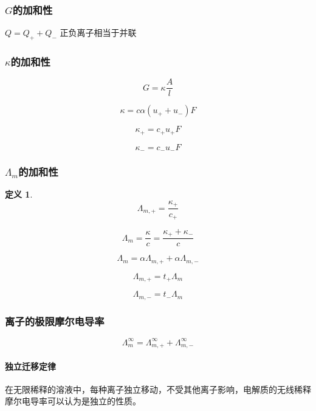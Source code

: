 \documentclass[a4paper]{ctexrep}
\newtheorem{definition}{定义}[chapter]
\begin{document}
        \subsubsection{$G$的加和性}

        $Q = Q_+ + Q_-$ 正负离子相当于并联

        \subsubsection{$\kappa$的加和性}

        \[
            G = \kappa \frac{A}{l}  
        \]

        \[
            \kappa = c\alpha(u_+ + u_-)F  
        \]

        \[
            \kappa_+ = c_+ u_+ F  
        \]

        \[
            \kappa_- = c_- u_- F  
        \]

        \subsubsection{$\varLambda_m$的加和性}

        \begin{definition}
            \[
                \varLambda_{m, +} = \frac{\kappa_+}{c_+}  
            \]
        \end{definition}

        \[
            \varLambda_m = \frac{\kappa}{c} = \frac{\kappa_+ + \kappa_-}{c}  
        \]

        \[
            \varLambda_m = \alpha \varLambda_{m, +} + \alpha \varLambda_{m, -}
        \]

        \[
            \varLambda_{m, +} = t_+ \varLambda_{m}  
        \]

        \[
            \varLambda_{m, -} = t_- \varLambda_{m}  
        \]

        \subsubsection{离子的极限摩尔电导率}

        \[
            \varLambda_m^\infty = \varLambda_{m, +}^\infty + \varLambda_{m, -}^\infty
        \]

        \paragraph{独立迁移定律} 在无限稀释的溶液中，每种离子独立移动，不受其他离子影响，电解质的无线稀释摩尔电导率可以认为是独立的性质。
\end{document}
